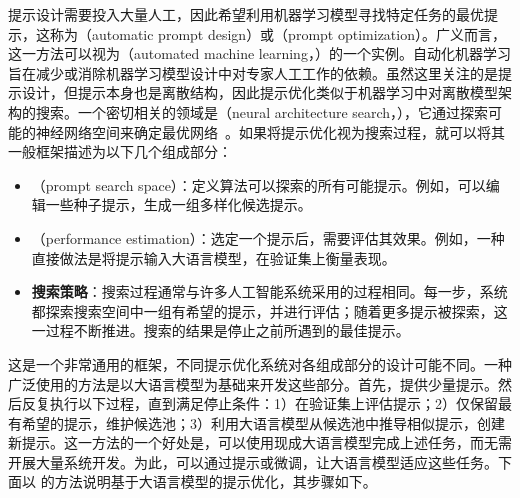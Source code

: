 \noindent 提示设计需要投入大量人工，因此希望利用机器学习模型寻找特定任务的最优提示，这称为（automatic prompt design）或（prompt optimization）。广义而言，这一方法可以视为（automated machine learning，）的一个实例。自动化机器学习旨在减少或消除机器学习模型设计中对专家人工工作的依赖。虽然这里关注的是提示设计，但提示本身也是离散结构，因此提示优化类似于机器学习中对离散模型架构的搜索。一个密切相关的领域是（neural architecture search，），它通过探索可能的神经网络空间来确定最优网络~\cite{zoph-and-Le:2016neural,elsken-etal:2019nas}。如果将提示优化视为搜索过程，就可以将其一般框架描述为以下几个组成部分：

\begin{itemize}
\item \vspace{0.5em} （prompt search space）：定义算法可以探索的所有可能提示。例如，可以编辑一些种子提示，生成一组多样化候选提示。
\item \vspace{0.3em} （performance estimation）：选定一个提示后，需要评估其效果。例如，一种直接做法是将提示输入大语言模型，在验证集上衡量表现。
\item \vspace{0.3em} \textbf{搜索策略}：搜索过程通常与许多人工智能系统采用的过程相同。每一步，系统都探索搜索空间中一组有希望的提示，并进行评估；随着更多提示被探索，这一过程不断推进。搜索的结果是停止之前所遇到的最佳提示。
\end{itemize}
\vspace{0.5em}

这是一个非常通用的框架，不同提示优化系统对各组成部分的设计可能不同。一种广泛使用的方法是以大语言模型为基础来开发这些部分。首先，提供少量提示。然后反复执行以下过程，直到满足停止条件：1）在验证集上评估提示；2）仅保留最有希望的提示，维护候选池；3）利用大语言模型从候选池中推导相似提示，创建新提示。这一方法的一个好处是，可以使用现成大语言模型完成上述任务，而无需开展大量系统开发。为此，可以通过提示或微调，让大语言模型适应这些任务。下面以 \citet{zhou-etal:2023large} 的方法说明基于大语言模型的提示优化，其步骤如下。

